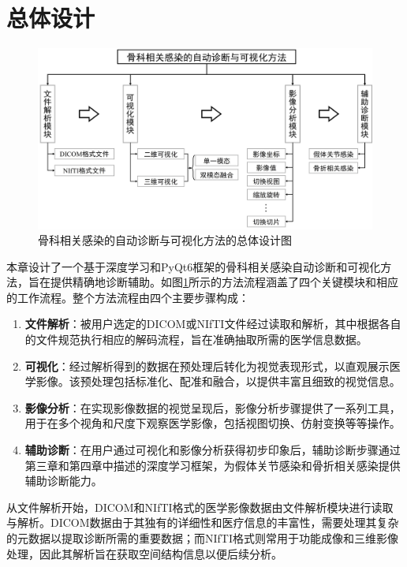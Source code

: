 \section{总体设计}

\begin{figure}[h]
  \centering
  \includegraphics[width=\textwidth]{figures/chap05_overall.jpg}
  \caption{骨科相关感染的自动诊断与可视化方法的总体设计图}
  \label{fig:chap05_overall}
\end{figure}

本章设计了一个基于深度学习和PyQt6框架的骨科相关感染自动诊断和可视化方法，旨在提供精确地诊断辅助。如图\ref{fig:chap05_overall}所示的方法流程涵盖了四个关键模块和相应的工作流程。整个方法流程由四个主要步骤构成：
\begin{enumerate}
  \item \textbf{文件解析}：被用户选定的DICOM或NIfTI文件经过读取和解析，其中根据各自的文件规范执行相应的解码流程，旨在准确抽取所需的医学信息数据。
  \item \textbf{可视化}：经过解析得到的数据在预处理后转化为视觉表现形式，以直观展示医学影像。该预处理包括标准化、配准和融合，以提供丰富且细致的视觉信息。
  \item \textbf{影像分析}：在实现影像数据的视觉呈现后，影像分析步骤提供了一系列工具，用于在多个视角和尺度下观察医学影像，包括视图切换、仿射变换等等操作。
  \item \textbf{辅助诊断}：在用户通过可视化和影像分析获得初步印象后，辅助诊断步骤通过第三章和第四章中描述的深度学习框架，为假体关节感染和骨折相关感染提供辅助诊断能力。
\end{enumerate}

从文件解析开始，DICOM和NIfTI格式的医学影像数据由文件解析模块进行读取与解析。DICOM数据由于其独有的详细性和医疗信息的丰富性，需要处理其复杂的元数据以提取诊断所需的重要数据；而NIfTI格式则常用于功能成像和三维影像处理，因此其解析旨在获取空间结构信息以便后续分析。

